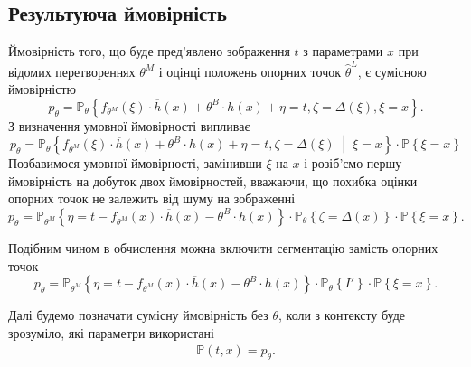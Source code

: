 \subsection{Результуюча ймовірність}

Ймовірність того,
що буде пред'явлено зображення $t$ з параметрами $x$
при відомих перетвореннях $\theta^M$
і оцінці положень опорних точок $\hat{\theta}^L$, є сумісною ймовірністю
\begin{equation*}
  p_{\theta}
  = \mathbb{P}_{\theta}\left\{
    f_{\theta^M}\left( \xi \right) \cdot \overline{h}\left( x \right)
      + \theta^B \cdot h\left( x \right) + \eta = t,
    \zeta = \Delta\left( \xi \right),
    \xi = x
  \right\}.
\end{equation*}
З визначення умовної ймовірності випливає
\begin{equation*}
  p_{\theta}
  = \mathbb{P}_{\theta}\left\{
      f_{\theta^M}\left( \xi \right) \cdot \overline{h}\left( x \right)
        + \theta^B \cdot h\left( x \right) + \eta = t,
      \zeta = \Delta\left( \xi \right)
      \;\middle|\; \xi = x \right\}
    \cdot \mathbb{P}\left\{ \xi = x \right\}
\end{equation*}
Позбавимося умовної ймовірності, замінивши $\xi$ на $x$
і розіб'ємо першу ймовірність на добуток двох ймовірностей,
вважаючи, що похибка оцінки опорних точок не залежить від шуму на зображенні
\begin{equation*}
  p_{\theta}
  = \mathbb{P}_{\theta^M}\left\{
      \eta = t
             - f_{\theta^M}\left( x \right) \cdot \overline{h}\left( x \right)
             - \theta^B \cdot h\left( x \right) \right\}
    \cdot \mathbb{P}_{\theta}\left\{
      \zeta = \Delta\left( x \right)
    \right\}
    \cdot \mathbb{P}\left\{ \xi = x \right\}.
\end{equation*}

Подібним чином в обчислення можна включити сегментацію замість опорних точок
\begin{equation*}
  p_{\theta}
  = \mathbb{P}_{\theta^M}\left\{
      \eta = t
             - f_{\theta^M}\left( x \right) \cdot \overline{h}\left( x \right)
             - \theta^B \cdot h\left( x \right) \right\}
    \cdot \mathbb{P}_{\theta}\left\{ I' \right\}
    \cdot \mathbb{P}\left\{ \xi = x \right\}.
\end{equation*}

Далі будемо позначати сумісну ймовірність без $\theta$,
коли з контексту буде зрозуміло,
які параметри використані
\begin{align*}
  \mathbb{P}\left( t, x \right) = p_{\theta}.
\end{align*}

